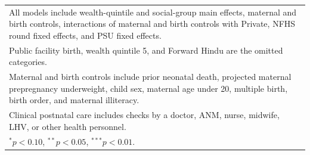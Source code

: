 {\begin{tabular}{l*{5}{c}}
\multicolumn{6}{l}{\footnotesize All models include wealth-quintile and social-group main effects, maternal and birth controls, interactions of maternal and birth controls with Private, NFHS round fixed effects, and PSU fixed effects.}\\
\multicolumn{6}{l}{\footnotesize Public facility birth, wealth quintile 5, and Forward Hindu are the omitted categories.}\\
\multicolumn{6}{l}{\footnotesize Maternal and birth controls include prior neonatal death, projected maternal prepregnancy underweight, child sex, maternal age under 20, multiple birth, birth order, and maternal illiteracy.}\\
\multicolumn{6}{l}{\footnotesize Clinical postnatal care includes checks by a doctor, ANM, nurse, midwife, LHV, or other health personnel.}\\
\multicolumn{6}{l}{\footnotesize $^{*}p<0.10$, $^{**}p<0.05$, $^{***}p<0.01$.}\\
\end{tabular}
}

